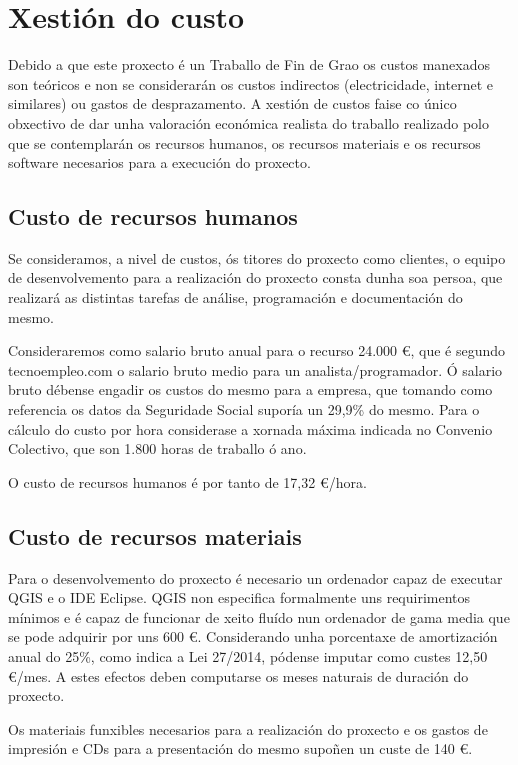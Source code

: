 \section{Xestión do custo}
Debido a que este proxecto é un Traballo de Fin de Grao os custos manexados son teóricos e non se considerarán os custos indirectos (electricidade, internet e similares) ou gastos de desprazamento. A xestión de custos faise co único obxectivo de dar unha valoración económica realista do traballo realizado polo que se contemplarán os recursos humanos, os recursos materiais e os recursos software necesarios para a execución do proxecto.

\subsection{Custo de recursos humanos}
Se consideramos, a nivel de custos, ós titores do proxecto como clientes, o equipo de desenvolvemento para a realización do proxecto consta dunha soa persoa, que realizará as distintas tarefas de análise, programación e documentación do mesmo.

Consideraremos como salario bruto anual para o recurso 24.000 \euro, que é segundo tecnoempleo.com\cite{InformeSalarios} o salario bruto medio para un analista/programador. Ó salario bruto débense engadir os custos do mesmo para a empresa, que tomando como referencia os datos da Seguridade Social\cite{TabCotizacion} suporía un 29,9\% do mesmo. Para o cálculo do custo por hora considerase a xornada máxima indicada no Convenio Colectivo\cite{BOEConvenio}, que son 1.800 horas de traballo ó ano.

O custo de recursos humanos é por tanto de 17,32 \euro/hora.

\subsection{Custo de recursos materiais}
Para o desenvolvemento do proxecto é necesario un ordenador capaz de executar QGIS e o IDE Eclipse. QGIS non especifica formalmente uns requirimentos mínimos e é capaz de funcionar de xeito fluído nun ordenador de gama media que se pode adquirir por uns 600 \euro. Considerando unha porcentaxe de amortización anual do 25\%, como indica a Lei 27/2014\cite{Lei27/14}, pódense imputar como custes 12,50 \euro/mes. A estes efectos deben computarse os meses naturais de duración do proxecto.

Os materiais funxibles necesarios para a realización do proxecto e os gastos de impresión e CDs para a presentación do mesmo supoñen un custe de 140 \euro.

